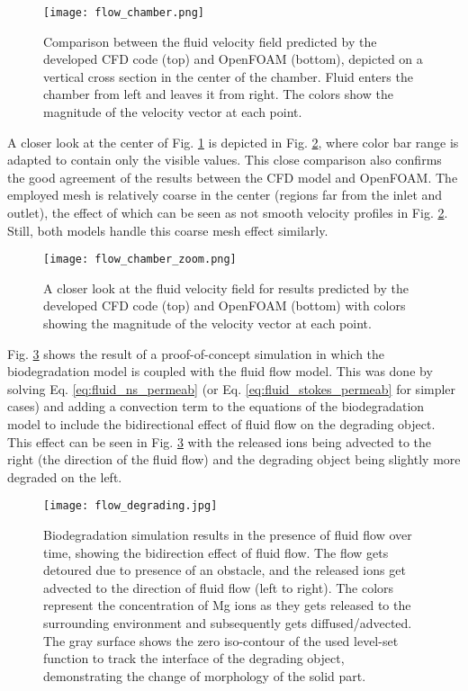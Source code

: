 \begin{figure}[h]
\centering
\medskip
\texttt{[image: flow\_chamber.png]}
\caption[Comparing flow field results of developed CFD code and OpenFOAM]{Comparison between the fluid velocity field predicted by the developed CFD code (top) and OpenFOAM (bottom), depicted on a vertical cross section in the center of the chamber. Fluid enters the chamber from left and leaves it from right. The colors show the magnitude of the velocity vector at each point.} \label{fig:fluid_flow_chamber}
\end{figure}

A closer look at the center of Fig. \ref{fig:fluid_flow_chamber} is depicted in Fig. \ref{fig:fluid_flow_chamber_zoom}, where color bar range is adapted to contain only the visible values. This close comparison also confirms the good agreement of the results between the CFD model and OpenFOAM. The employed mesh is relatively coarse in the center (regions far from the inlet and outlet), the effect of which can be seen as not smooth velocity profiles in Fig. \ref{fig:fluid_flow_chamber_zoom}. Still, both models handle this coarse mesh effect similarly.

\begin{figure}[h]
\centering
\medskip
\texttt{[image: flow\_chamber\_zoom.png]}
\caption[Comparing flow field results of developed CFD code and OpenFOAM - zoomed view]{A closer look at the fluid velocity field for results predicted by the developed CFD code (top) and OpenFOAM (bottom) with colors showing the magnitude of the velocity vector at each point.} \label{fig:fluid_flow_chamber_zoom}
\end{figure}

Fig. \ref{fig:fluid_flow_degrading} shows the result of a proof-of-concept simulation in which the biodegradation model \cite{Barzegari2021} is coupled with the fluid flow model. This was done by solving Eq. \ref{eq:fluid_ns_permeab} (or Eq. \ref{eq:fluid_stokes_permeab} for simpler cases) and adding a convection term to the equations of the biodegradation model to include the bidirectional effect of fluid flow on the degrading object. This effect can be seen in Fig. \ref{fig:fluid_flow_degrading} with the released ions being advected to the right (the direction of the fluid flow) and the degrading object being slightly more degraded on the left.

\begin{figure}[h]
\centering
\medskip
\texttt{[image: flow\_degrading.jpg]}
\caption[Biodegradation simulation results in the presence of fluid flow]{Biodegradation simulation results in the presence of fluid flow over time, showing the bidirection effect of fluid flow. The flow gets detoured due to presence of an obstacle, and the released ions get advected to the direction of fluid flow (left to right). The colors represent the concentration of Mg ions as they gets released to the surrounding environment and subsequently gets diffused/advected. The gray surface shows the zero iso-contour of the used level-set function to track the interface of the degrading object, demonstrating the change of morphology of the solid part.} \label{fig:fluid_flow_degrading}
\end{figure}

